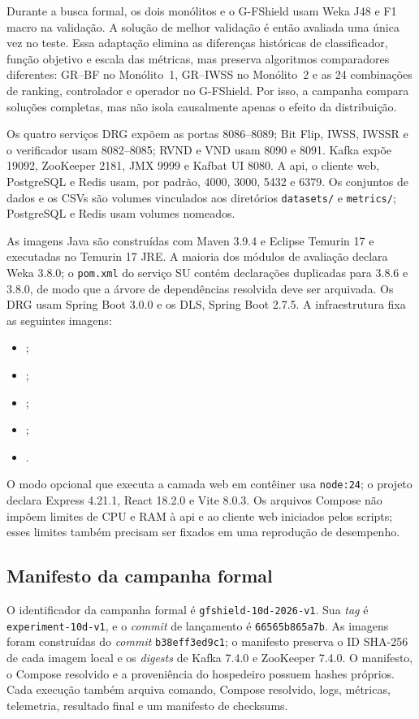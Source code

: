 Durante a busca formal, os dois monólitos e o G-FShield usam Weka J48 e F1 macro na validação. A solução de melhor validação é então avaliada uma única vez no teste. Essa adaptação elimina as diferenças históricas de classificador, função objetivo e escala das métricas, mas preserva algoritmos comparadores diferentes: GR--BF no Monólito~1, GR--IWSS no Monólito~2 e as 24 combinações de ranking, controlador e operador no G-FShield. Por isso, a campanha compara soluções completas, mas não isola causalmente apenas o efeito da distribuição.

Os quatro serviços DRG expõem as portas 8086--8089; Bit Flip, IWSS, IWSSR e o verificador usam 8082--8085; RVND e VND usam 8090 e 8091. Kafka expõe 19092, ZooKeeper 2181, JMX 9999 e Kafbat UI 8080. A \ac{api}, o cliente web, PostgreSQL e Redis usam, por padrão, 4000, 3000, 5432 e 6379. Os conjuntos de dados e os CSVs são volumes vinculados aos diretórios \texttt{datasets/} e \texttt{metrics/}; PostgreSQL e Redis usam volumes nomeados.

As imagens Java são construídas com Maven 3.9.4 e Eclipse Temurin 17 e executadas no Temurin 17 JRE. A maioria dos módulos de avaliação declara Weka 3.8.0; o \texttt{pom.xml} do serviço SU contém declarações duplicadas para 3.8.6 e 3.8.0, de modo que a árvore de dependências resolvida deve ser arquivada. Os DRG usam Spring Boot 3.0.0 e os DLS, Spring Boot 2.7.5. A infraestrutura fixa as seguintes imagens:
\begin{itemize}
  \item {};
  \item {};
  \item {};
  \item {};
  \item {}.
\end{itemize}
O modo opcional que executa a camada web em contêiner usa \texttt{node:24}; o projeto declara Express 4.21.1, React 18.2.0 e Vite 8.0.3. Os arquivos Compose não impõem limites de CPU e RAM à \ac{api} e ao cliente web iniciados pelos scripts; esses limites também precisam ser fixados em uma reprodução de desempenho.

\subsection{Manifesto da campanha formal}

O identificador da campanha formal é \texttt{gfshield-10d-2026-v1}. Sua \textit{tag} é \texttt{experiment-10d-v1}, e o \textit{commit} de lançamento é \texttt{66565b865a7b}. As imagens foram construídas do \textit{commit} \texttt{b38eff3ed9c1}; o manifesto preserva o ID SHA-256 de cada imagem local e os \textit{digests} de Kafka 7.4.0 e ZooKeeper 7.4.0. O manifesto, o Compose resolvido e a proveniência do hospedeiro possuem hashes próprios. Cada execução também arquiva comando, Compose resolvido, logs, métricas, telemetria, resultado final e um manifesto de checksums.

